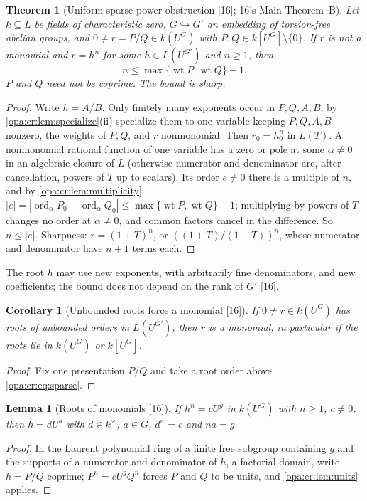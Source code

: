 \documentclass[11pt,oneside]{article}
\numberwithin{equation}{section}
\newtheorem{theorem}{Theorem}[section]
\newtheorem{lemma}[lemma]{Lemma}
\newtheorem{corollary}[corollary]{Corollary}
\theoremstyle{definition}
\theoremstyle{remark}
\newcommand{\src}[1]{\textup{\textsf{\small[#1]}}}
\begin{document}
\begin{theorem}[Uniform sparse power obstruction \src{16}; 16's Main Theorem~B]\label{opa:cr:thm:sparse}
Let $k\subseteq L$ be fields of characteristic zero, $G\hookrightarrow G'$ an embedding of torsion-free abelian
groups, and $0\ne r=P/Q\in k(U^G)$ with $P,Q\in k[U^G]\setminus\{0\}$. If $r$ is not a monomial and $r=h^n$ for some
$h\in L(U^{G'})$ and $n\ge1$, then
\begin{equation}\label{opa:cr:eq:sparse}
 n\le\max\{\operatorname{wt}P,\operatorname{wt}Q\}-1 .
\end{equation}
$P$ and $Q$ need not be coprime. The bound is sharp.
\end{theorem}
\begin{proof}
Write $h=A/B$. Only finitely many exponents occur in $P,Q,A,B$; by \cref{opa:cr:lem:specialize}(ii) specialize them
to one variable keeping $P,Q,A,B$ nonzero, the weights of $P,Q$, and $r$ nonmonomial. Then $r_0=h_0^n$ in $L(T)$.
A nonmonomial rational function of one variable has a zero or pole at some $\alpha\ne0$ in an algebraic closure of
$L$ (otherwise numerator and denominator are, after cancellation, powers of $T$ up to scalars). Its order
$e\ne0$ there is a multiple of $n$, and by \cref{opa:cr:lem:multiplicity}
$|e|=|\operatorname{ord}_\alpha P_0-\operatorname{ord}_\alpha Q_0|\le\max\{\operatorname{wt}P,\operatorname{wt}Q\}-1$;
multiplying by powers of $T$ changes no order at $\alpha\ne0$, and common factors cancel in the difference. So
$n\le|e|$. Sharpness: $r=(1+T)^n$, or $((1+T)/(1-T))^n$, whose numerator and denominator have $n+1$ terms each.
\end{proof}

The root $h$ may use new exponents, with arbitrarily fine denominators, and new coefficients; the bound does not
depend on the rank of $G'$ \src{16}.

\begin{corollary}[Unbounded roots force a monomial \src{16}]\label{opa:cr:cor:unbounded}
If $0\ne r\in k(U^G)$ has roots of unbounded orders in $L(U^{G'})$, then $r$ is a monomial; in particular if the
roots lie in $k(U^G)$ or $k[U^G]$.
\end{corollary}
\begin{proof}
Fix one presentation $P/Q$ and take a root order above \eqref{opa:cr:eq:sparse}.
\end{proof}

\begin{lemma}[Roots of monomials \src{16}]\label{opa:cr:lem:rootmonomial}
If $h^n=cU^g$ in $k(U^G)$ with $n\ge1$, $c\ne0$, then $h=dU^a$ with $d\in k^\times$, $a\in G$, $d^n=c$ and $na=g$.
\end{lemma}
\begin{proof}
In the Laurent polynomial ring of a finite free subgroup containing $g$ and the supports of a numerator and
denominator of $h$, a factorial domain, write $h=P/Q$ coprime; $P^n=cU^gQ^n$ forces $P$ and $Q$ to be units, and
\cref{opa:cr:lem:units} applies.
\end{proof}
\end{document}
